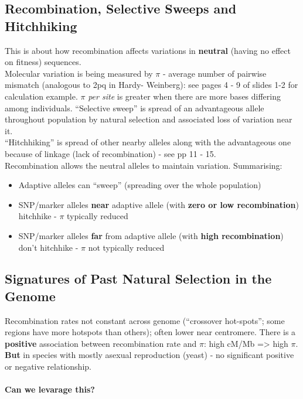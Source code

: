 \documentclass{scrartcl}
\begin{document}
\subsection{Recombination, Selective Sweeps and Hitchhiking}
\label{08-02}
This is about how recombination affects variations in {\bf neutral} (having no effect on fitness) sequences.\\
Molecular variation is being measured by $\pi$ - average number of pairwise mismatch (analogous to 2pq in Hardy- Weinberg): see pages 4 - 9 of slides 1-2 for calculation example.
$\pi$ {\em per site} is greater when there are more bases differing among individuals.
``Selective sweep'' is spread of an advantageous allele throughout population by natural selection and associated loss of variation near it.\\
``Hitchhiking'' is spread of other nearby alleles along with the advantageous one because of linkage (lack of recombination) - see pp 11 - 15.\\
Recombination allows the neutral alleles to maintain variation.
Summarising:
\begin{itemize}
\item Adaptive alleles can ``sweep'' (spreading over the whole population)
\item SNP/marker alleles {\bf near} adaptive allele (with {\bf zero or low recombination}) hitchhike - $\pi$ typically reduced
\item SNP/marker alleles {\bf far} from adaptive allele (with {\bf high recombination}) don't hitchhike - $\pi$ not typically reduced
\end{itemize}

\subsection{Signatures of Past Natural Selection in the Genome}
\label{sec:08-03}
Recombination rates not constant across genome (``crossover hot-spots''; some regions have more hotspots than others); often lower near centromere.
There is a {\bf positive } association between recombination rate and $\pi$: high cM/Mb => high $\pi$.\\
{\bf But} in species with mostly asexual reproduction (yeast) - no significant positive or negative relationship.
\paragraph{Can we levarage this?}
\end{document}
